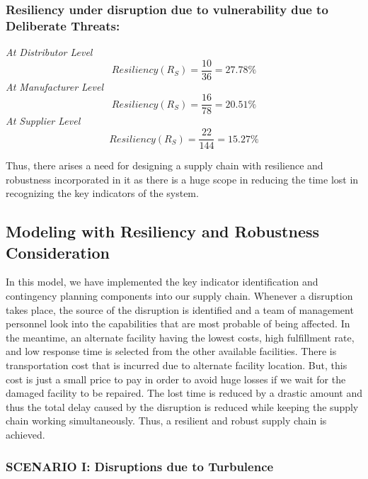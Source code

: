 \subsubsection{Resiliency under disruption due to vulnerability due to Deliberate Threats:}

\textit{At Distributor Level}
\begin{equation}
    Resiliency(R_S) = \frac{10}{36} = 27.78 \% \label{3.14}
\end{equation}
\newline
\textit{At Manufacturer Level}
\begin{equation}
    Resiliency(R_S) = \frac{16}{78} = 20.51 \% \label{3.15}
\end{equation}
\newline
\textit{At Supplier Level}
\begin{equation}
    Resiliency(R_S) = \frac{22}{144} = 15.27 \% \label{3.16}
\end{equation}


Thus, there arises a need for designing a supply chain with resilience and robustness incorporated in it as there is a huge scope in reducing the time lost in recognizing the key indicators of the system. 


\subsection{Modeling with Resiliency and Robustness Consideration}

In this model, we have implemented the key indicator identification and contingency planning components into our supply chain. Whenever a disruption takes place, the source of the disruption is identified and a team of management personnel look into the capabilities that are most probable of being affected. In the meantime, an alternate facility having the lowest costs, high fulfillment rate, and low response time is selected from the other available facilities. There is transportation cost that is incurred due to alternate facility location. But, this cost is just a small price to pay in order to avoid huge losses if we wait for the damaged facility to be repaired. The lost time is reduced by a drastic amount and thus the total delay caused by the disruption is reduced while keeping the supply chain working simultaneously. Thus, a resilient and robust supply chain is achieved.

\subsubsection{SCENARIO I: Disruptions due to Turbulence}

